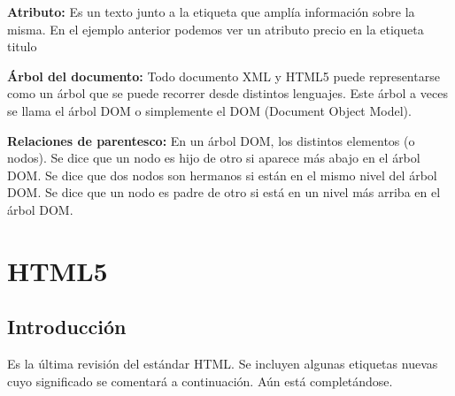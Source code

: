 \documentclass[letterpaper,10pt,spanish]{sphinxmanual}
\begin{document}
\textbf{Atributo:} Es un texto junto a la etiqueta que amplía información sobre la misma. En el ejemplo
anterior podemos ver un atributo precio en la etiqueta titulo

\textbf{Árbol del documento:} Todo documento XML y HTML5 puede representarse como un árbol
que se puede recorrer desde distintos lenguajes. Este árbol a veces se llama el árbol DOM
o simplemente el DOM (Document Object Model).

\textbf{Relaciones de parentesco:} En un árbol DOM, los distintos elementos (o nodos). Se dice que
un nodo es hijo de otro si aparece más abajo en el árbol DOM. Se dice que dos nodos
son hermanos si están en el mismo nivel del árbol DOM. Se dice que un nodo es padre
de otro si está en un nivel más arriba en el árbol DOM.


\chapter{HTML5}
\label{tema2::doc}\label{tema2:html5}

\section{Introducción}
\label{tema2:introduccion}
Es la última revisión del estándar HTML. Se incluyen algunas etiquetas nuevas cuyo significado
se comentará a continuación. Aún está completándose.
\end{document}
